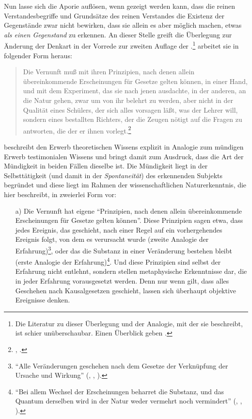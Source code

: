 \begin{nummerierung}
Nun lasse sich die Aporie auflösen, wenn gezeigt werden kann, dass die reinen
Verstandesbegriffe und Grundsätze des reinen Verstandes die Existenz der
Gegenstände zwar nicht bewirken, dass sie allein es aber möglich machen, etwas
\emph{als einen Gegenstand} zu erkennen. An dieser Stelle greift die Überlegung
zur Änderung der Denkart in der Vorrede zur zweiten Auflage der .\footnote{Die Literatur zu dieser Überlegung und der
Analogie, mit der  sie beschreibt, ist schier
unüberschaubar. Einen Überblick geben
\textcite[vgl.][]{Schoenecker:Kantskopernikanisch-newtonischeAnalogie2011}.}
 arbeitet sie in folgender Form heraus:
\begin{quote}
Die Vernunft muß mit ihren Prinzipien, nach denen allein übereinkommende
Erscheinungen für Gesetze gelten können, in einer Hand, und mit dem Experiment,
das sie nach jenen ausdachte, in der anderen, an die Natur gehen, zwar um von
ihr belehrt zu werden, aber nicht in der Qualität eines Schülers, der sich alles
vorsagen läßt, was der Lehrer will, sondern eines bestallten Richters, der die
Zeugen nötigt auf die Fragen zu antworten, die der er ihnen
vorlegt.\footnote{\cite[][B xiii]{Kant:KritikderreinenVernunft2003},
\cite[][III: 10.21--28]{Kant:GesammelteWerke1900ff.}.}
\end{quote}
 beschreibt den Erwerb theoretischen Wissens explizit in
Analogie zum mündigen Erwerb testimonialen Wissens und bringt damit zum
Ausdruck, dass die Art der Mündigkeit in beiden Fällen dieselbe ist. Die
Mündigkeit liegt in der Selbsttätigkeit (und damit in der \emph{Spontaneität})
des erkennenden Subjekts begründet und diese liegt im Rahmen der wissenschaftlichen
Naturerkenntnis, die  hier beschreibt, in zweierlei Form
vor:
\begin{enumerate}
\item[a)] Die Vernunft hat eigene \enquote{Prinzipien, nach denen allein
übereinkommende Erscheinungen für Gesetze gelten können}. Diese Prinzipien sagen
etwa, dass jedes Ereignis, das geschieht, nach einer Regel auf ein
vorhergehendes Ereignis folgt, von dem es verursacht wurde (zweite Analogie der
Erfahrung)\footnote{\enquote{Alle Veränderungen geschehen nach dem Gesetze der
Verknüpfung der Ursache und Wirkung}
\mkbibparens{\cite[][B 232]{Kant:KritikderreinenVernunft2003},
\cite[][III: 166.32--33]{Kant:GesammelteWerke1900ff.}, \ohio}.}, oder das die
Substanz in einer Veränderung bestehen bleibt (erste Analogie der
Erfahrung)\footnote{\enquote{Bei allem Wechsel der Erscheinungen beharret die
Substanz, und das Quantum derselben wird in der Natur weder vermehrt noch
vermindert} \mkbibparens{\cite[][B 224]{Kant:KritikderreinenVernunft2003},
\cite[][III: 162.4--6]{Kant:GesammelteWerke1900ff.}, \ohio}.}. Und diese
Prinzipien sind selbst der Erfahrung nicht entlehnt, sondern stellen
metaphysische Erkenntnisse dar, die in jeder Erfahrung vorausgesetzt werden.
Denn nur wenn gilt, dass alles Geschehen nach Kausalgesetzen geschieht, lassen
sich überhaupt objektive Ereignisse denken.


\end{enumerate}
\end{nummerierung}
